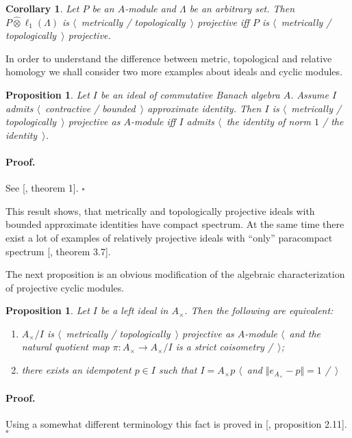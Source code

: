 \documentclass[12pt]{article}
\newcommand{\projtens}{\mathbin{\widehat{\otimes}}}
\newtheorem{proposition}[theorem]{Proposition}
\newtheorem{corollary}[theorem]{Corollary}
\renewenvironment{proof}{\paragraph{Proof.}}{\hfill$\square$\medskip}
\begin{document}
\begin{corollary}\label{MetTopProjTensProdWithl1} Let $P$ be an $A$-module and
    $\Lambda$ be an arbitrary set. Then $P\projtens \ell_1(\Lambda)$ is
    $\langle$~metrically / topologically~$\rangle$ projective iff $P$ is
    $\langle$~metrically / topologically~$\rangle$ projective.
\end{corollary}

In order to understand the difference between metric, topological and relative
homology we shall consider two more examples about ideals and cyclic modules.

\begin{proposition}\label{GoodCommIdealMetTopProjIsUnital} Let $I$ be an ideal
    of commutative Banach algebra $A$. Assume $I$ admits $\langle$~contractive /
    bounded~$\rangle$ approximate identity. Then $I$ is $\langle$~metrically /
    topologically~$\rangle$ projective as $A$-module iff $I$ admits
    $\langle$~the identity of norm $1$ / the identity~$\rangle$.
\end{proposition}
\begin{proof} See [\cite{NemMetTopProjIdBanAlg}, theorem 1].
\end{proof}

This result shows, that metrically and topologically projective ideals with
bounded approximate identities have compact spectrum. At the same time there
exist a lot of examples of relatively projective ideals with ``only''
paracompact spectrum  [\cite{HelHomolBanTopAlg}, theorem 3.7].

The next proposition is an obvious modification of the algebraic
characterization of projective cyclic modules.


\begin{proposition}\label{MetTopProjCycModCharac} Let $I$ be a left ideal in
    $A_\times $. Then the following are equivalent:
    \begin{enumerate}[label = (\roman*)]
        \item $A_\times /I$ is $\langle$~metrically / topologically~$\rangle$
              projective as $A$-module $\langle$~and the natural quotient map
              $\pi:A_\times \to A_\times /I$ is a strict coisometry /~$\rangle$;

        \item there exists an idempotent $p\in I$ such that $I=A_\times  p$
              $\langle$~and $\Vert e_{A_\times }-p\Vert= 1$ /~$\rangle$
    \end{enumerate}
\end{proposition}
\begin{proof} Using a somewhat different terminology this fact is proved in
        [\cite{WhiteInjmoduAlg}, proposition 2.11].
\end{proof}
\end{document}
